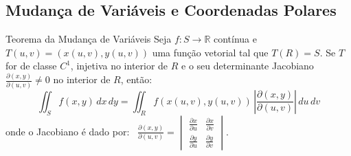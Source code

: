 \documentclass[11pt,a4paper]{article}
\newcommand{\R}{\mathbb{R}}
\begin{document}
\subsection{Mudança de Variáveis e Coordenadas Polares}

\begin{theorembox}{Teorema da Mudança de Variáveis}
  Seja $f : S \to \R$ contínua e $T(u, v) = (x(u,v), y(u,v))$ uma função vetorial tal que $T(R) = S$. Se $T$ for de classe $C^1$, injetiva no interior de $R$ e o seu determinante Jacobiano $\frac{\partial(x, y)}{\partial(u, v)} \neq 0$ no interior de $R$, então:
  \[ \iint_S f(x, y) \, dx \, dy = \iint_R f(x(u, v), y(u, v)) \, \left| \frac{\partial(x, y)}{\partial(u, v)} \right| \, du \, dv \]
  onde o Jacobiano é dado por: \ $\frac{\partial(x, y)}{\partial(u, v)} = \begin{vmatrix} \frac{\partial x}{\partial u} & \frac{\partial x}{\partial v} \\ \frac{\partial y}{\partial u} & \frac{\partial y}{\partial v} \end{vmatrix}$.
\end{theorembox}
\end{document}
